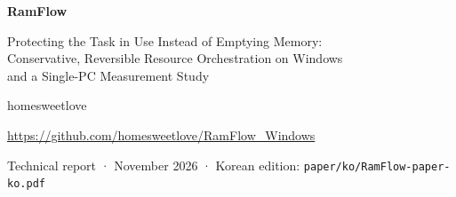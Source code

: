 \documentclass[11pt]{article}
\begin{document}
\thispagestyle{plain}

\begin{center}
{\sffamily\bfseries\LARGE RamFlow\par}
\vspace{4pt}
{\sffamily\large Protecting the Task in Use Instead of Emptying Memory:\\Conservative, Reversible Resource Orchestration on Windows\\and a Single-PC Measurement Study\par}
\vspace{10pt}
{\normalsize homesweetlove\par}
{\small\color{ink2}\url{https://github.com/homesweetlove/RamFlow_Windows}\par}
\vspace{2pt}
{\small\color{ink2}Technical report · November 2026 · Korean edition: \texttt{paper/ko/RamFlow-paper-ko.pdf}\par}
\end{center}
\end{document}
